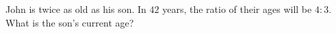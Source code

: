 John is twice as old as his son. In $42$ years, the ratio of their ages will be $4:3$. What is the son's current age?
